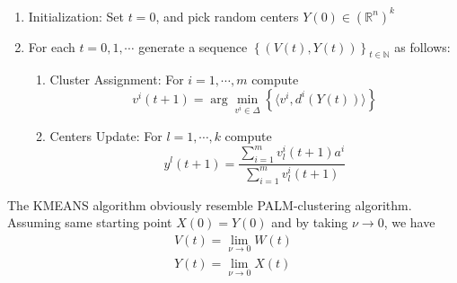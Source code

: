 \documentclass[11pt]{article}
\numberwithin{equation}{section}
\begin{document}
\begin{enumerate}[(1)]
	\item Initialization: Set $t=0$, and pick random centers $Y(0) \in (\mathbb{R}^n)^k$

	\item For each $t=0,1, \cdots$ generate a sequence $\left\lbrace(V(t),Y(t))\right\rbrace_{t \in \mathbb{N}}$ as follows:
	\begin{enumerate}[(2.1)]
		\item Cluster Assignment: For $i=1, \cdots ,m$ compute
		\begin{equation}
			v^i(t+1) = \arg\min\limits_{v^i \in \Delta} \left\lbrace \langle v^i , d^i(Y(t)) \rangle\right\rbrace \label{StateEq12}
		\end{equation}
		
		\item Centers Update: For $l=1, \cdots ,k$ compute
		\begin{equation}
			y^l(t+1) = \frac{\sum_{i=1}^{m} v^i_l(t+1) a^i}{\sum_{i=1}^{m} v^i_l(t+1)} \label{StateEq13}
		\end{equation}
	\end{enumerate}
\end{enumerate}
The KMEANS algorithm obviously resemble PALM-clustering algorithm. Assuming same starting point $X(0) = Y(0)$ and by taking $\nu \to 0$, we have
\begin{equation*}
	\begin{split}
	V(t) = \lim_{\nu \to 0} W(t) \\
	Y(t) = \lim_{\nu \to 0} X(t)
	\end{split}
\end{equation*}

\newpage
\end{document}
